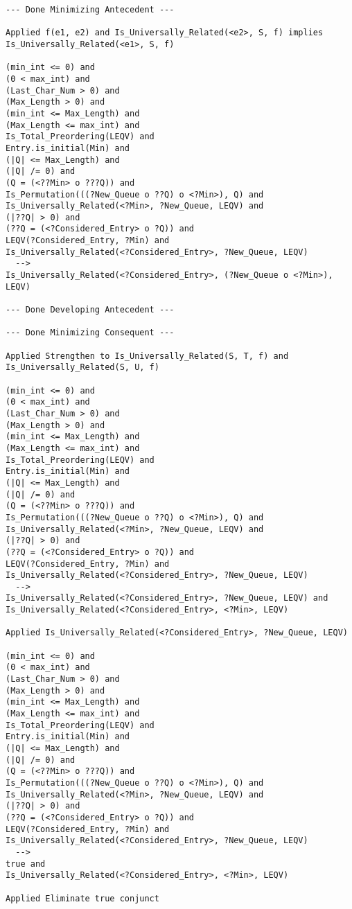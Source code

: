 \begin{lstlisting}[language=resolve]
--- Done Minimizing Antecedent ---

Applied f(e1, e2) and Is_Universally_Related(<e2>, S, f) implies Is_Universally_Related(<e1>, S, f)

(min_int <= 0) and
(0 < max_int) and
(Last_Char_Num > 0) and
(Max_Length > 0) and
(min_int <= Max_Length) and
(Max_Length <= max_int) and
Is_Total_Preordering(LEQV) and
Entry.is_initial(Min) and
(|Q| <= Max_Length) and
(|Q| /= 0) and
(Q = (<??Min> o ???Q)) and
Is_Permutation(((?New_Queue o ??Q) o <?Min>), Q) and
Is_Universally_Related(<?Min>, ?New_Queue, LEQV) and
(|??Q| > 0) and
(??Q = (<?Considered_Entry> o ?Q)) and
LEQV(?Considered_Entry, ?Min) and
Is_Universally_Related(<?Considered_Entry>, ?New_Queue, LEQV)
  -->
Is_Universally_Related(<?Considered_Entry>, (?New_Queue o <?Min>), LEQV)

--- Done Developing Antecedent ---

--- Done Minimizing Consequent ---

Applied Strengthen to Is_Universally_Related(S, T, f) and Is_Universally_Related(S, U, f)

(min_int <= 0) and
(0 < max_int) and
(Last_Char_Num > 0) and
(Max_Length > 0) and
(min_int <= Max_Length) and
(Max_Length <= max_int) and
Is_Total_Preordering(LEQV) and
Entry.is_initial(Min) and
(|Q| <= Max_Length) and
(|Q| /= 0) and
(Q = (<??Min> o ???Q)) and
Is_Permutation(((?New_Queue o ??Q) o <?Min>), Q) and
Is_Universally_Related(<?Min>, ?New_Queue, LEQV) and
(|??Q| > 0) and
(??Q = (<?Considered_Entry> o ?Q)) and
LEQV(?Considered_Entry, ?Min) and
Is_Universally_Related(<?Considered_Entry>, ?New_Queue, LEQV)
  -->
Is_Universally_Related(<?Considered_Entry>, ?New_Queue, LEQV) and
Is_Universally_Related(<?Considered_Entry>, <?Min>, LEQV)

Applied Is_Universally_Related(<?Considered_Entry>, ?New_Queue, LEQV)

(min_int <= 0) and
(0 < max_int) and
(Last_Char_Num > 0) and
(Max_Length > 0) and
(min_int <= Max_Length) and
(Max_Length <= max_int) and
Is_Total_Preordering(LEQV) and
Entry.is_initial(Min) and
(|Q| <= Max_Length) and
(|Q| /= 0) and
(Q = (<??Min> o ???Q)) and
Is_Permutation(((?New_Queue o ??Q) o <?Min>), Q) and
Is_Universally_Related(<?Min>, ?New_Queue, LEQV) and
(|??Q| > 0) and
(??Q = (<?Considered_Entry> o ?Q)) and
LEQV(?Considered_Entry, ?Min) and
Is_Universally_Related(<?Considered_Entry>, ?New_Queue, LEQV)
  -->
true and
Is_Universally_Related(<?Considered_Entry>, <?Min>, LEQV)

Applied Eliminate true conjunct


\end{lstlisting}
